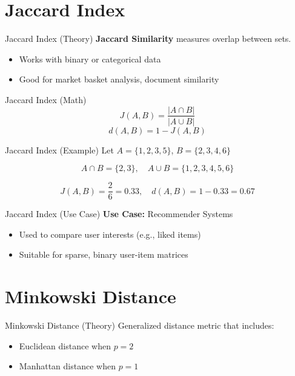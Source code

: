 \documentclass{beamer}
\begin{document}
\section{Jaccard Index}
\begin{frame}{Jaccard Index (Theory)}
\textbf{Jaccard Similarity} measures overlap between sets.
\begin{itemize}
    \item Works with binary or categorical data
    \item Good for market basket analysis, document similarity
\end{itemize}
\end{frame}

\begin{frame}{Jaccard Index (Math)}
\[
J(A, B) = \frac{|A \cap B|}{|A \cup B|}
\]
\[
d(A, B) = 1 - J(A, B)
\]
\end{frame}
\begin{frame}{Jaccard Index (Example)}
Let \( A = \{1, 2, 3, 5\} \), \( B = \{2, 3, 4, 6\} \)

\[
A \cap B = \{2, 3\},\quad A \cup B = \{1, 2, 3, 4, 5, 6\}
\]

\[
J(A, B) = \frac{2}{6} = 0.33,\quad d(A, B) = 1 - 0.33 = 0.67
\]
\end{frame}

\begin{frame}{Jaccard Index (Use Case)}
\textbf{Use Case:} Recommender Systems
\begin{itemize}
    \item Used to compare user interests (e.g., liked items)
    \item Suitable for sparse, binary user-item matrices
\end{itemize}
\end{frame}

\section{Minkowski Distance}
\begin{frame}{Minkowski Distance (Theory)}
Generalized distance metric that includes:
\begin{itemize}
    \item Euclidean distance when \( p = 2 \)
    \item Manhattan distance when \( p = 1 \)
\end{itemize}
\end{frame}
\end{document}
